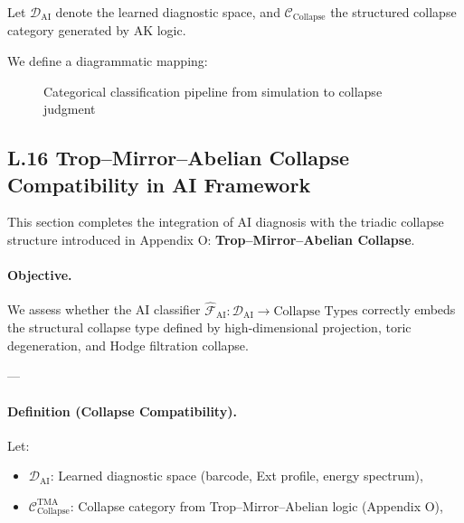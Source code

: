 \documentclass[11pt]{article}
\begin{document}
\begin{axiom}
\begin{axiom}
{{Let $\mathcal{D}_{\text{AI}}$ denote the learned diagnostic space,  
and $\mathcal{C}_{\text{Collapse}}$ the structured collapse category generated by AK logic.

We define a diagrammatic mapping:

\begin{figure}[htbp]
\centering

\caption{Categorical classification pipeline from simulation to collapse judgment}
\end{figure}

\subsection*{L.16 Trop–Mirror–Abelian Collapse Compatibility in AI Framework}

This section completes the integration of AI diagnosis with the triadic collapse structure introduced in Appendix O:  
\textbf{Trop–Mirror–Abelian Collapse}.

\paragraph{Objective.}  
We assess whether the AI classifier \( \widehat{\mathcal{F}}_{\text{AI}}: \mathcal{D}_{\text{AI}} \to \text{Collapse Types} \)  
correctly embeds the structural collapse type defined by high-dimensional projection, toric degeneration, and Hodge filtration collapse.

---

\paragraph{Definition (Collapse Compatibility).}

Let:
\begin{itemize}
  \item \( \mathcal{D}_{\text{AI}} \): Learned diagnostic space (barcode, Ext profile, energy spectrum),
  \item \( \mathcal{C}^{\mathrm{TMA}}_{\text{Collapse}} \): Collapse category from Trop–Mirror–Abelian logic (Appendix O),
\end{itemize}

}}
\end{axiom}
\end{axiom}
\end{document}
